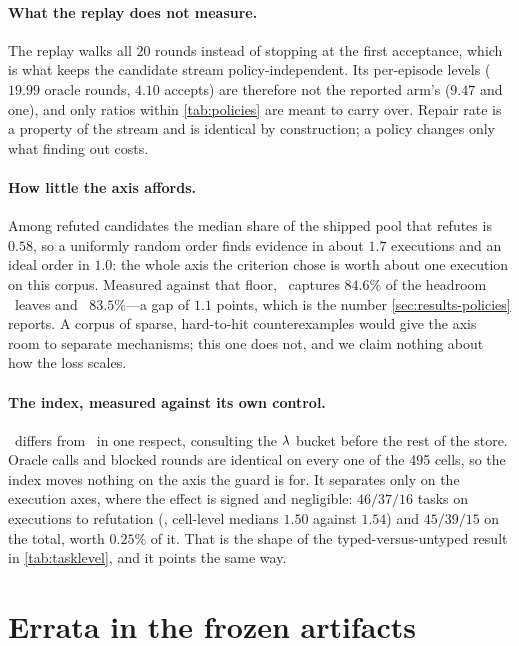 \paragraph{What the replay does not measure.}
The replay walks all $20$ rounds instead of stopping at the first acceptance,
which is what keeps the candidate stream policy-independent. Its per-episode
levels ($19.99$ oracle rounds, $4.10$ accepts) are therefore not the reported
arm's ($9.47$ and one), and only ratios within \cref{tab:policies} are meant to
carry over. Repair rate is a property of the stream and is identical by
construction; a policy changes only what finding out costs.

\paragraph{How little the axis affords.}
Among refuted candidates the median share of the shipped pool that refutes is
$0.58$, so a uniformly random order finds evidence in about $1.7$ executions
and an ideal order in $1.0$: the whole axis the criterion chose is worth about
one execution on this corpus. Measured against that floor, \polven\ captures
$84.6\%$ of the headroom \polk\ leaves and \polguard\ $83.5\%$---a gap of $1.1$
points, which is the number \cref{sec:results-policies} reports. A corpus of
sparse, hard-to-hit counterexamples would give the axis room to separate
mechanisms; this one does not, and we claim nothing about how the loss scales.

\paragraph{The index, measured against its own control.}
\polguard\ differs from \poldedup\ in one respect, consulting the $\lambda$ bucket
before the rest of the store. Oracle calls and blocked rounds are identical on
every one of the \num{495} cells, so the index moves nothing on the axis the
guard is for. It separates only on the execution axes, where the effect is
signed and negligible: $46/37/16$ tasks on executions to refutation
(, cell-level medians $1.50$ against $1.54$) and $45/39/15$ on the
total, worth $0.25\%$ of it. That is the shape of the typed-versus-untyped
result in \cref{tab:tasklevel}, and it points the same way.

\section{Errata in the frozen artifacts}
\label{app:errata}

